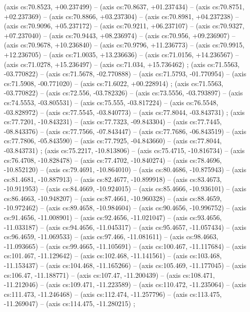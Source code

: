     (axis cs:70.8523,    +00.237499) --  (axis cs:70.8637,    +01.237434) --  (axis cs:70.8751,    +02.237369) --  (axis cs:70.8866,    +03.237304) --  (axis cs:70.8981,    +04.237238) --  (axis cs:70.9096,    +05.237172) --  (axis cs:70.9211,    +06.237107) --  (axis cs:70.9327,    +07.237040) --  (axis cs:70.9443,    +08.236974) --  (axis cs:70.956,    +09.236907) --  (axis cs:70.9678,    +10.236840) --  (axis cs:70.9796,    +11.236773) --  (axis cs:70.9915,    +12.236705) --  (axis cs:71.0035,    +13.236636) --  (axis cs:71.0156,    +14.236567) --  (axis cs:71.0278,    +15.236497) --  (axis cs:71.034,    +15.736462) ;
    (axis cs:71.5563,    -03.770822) --  (axis cs:71.5678,    -02.770888) --  (axis cs:71.5793,    -01.770954) --  (axis cs:71.5908,    -00.771020) --  (axis cs:71.6022,    +00.228914) ;
    (axis cs:71.5563,    -03.770822) --  (axis cs:72.556,    -03.782326) --  (axis cs:73.5556,    -03.793897) --  (axis cs:74.5553,    -03.805531) --  (axis cs:75.555,    -03.817224) --  (axis cs:76.5548,    -03.828972) --  (axis cs:77.5545,    -03.840773) --  (axis cs:77.8044,    -03.843731) ;
    (axis cs:77.7201,    -10.843231) --  (axis cs:77.7323,    -09.843304) --  (axis cs:77.7445,    -08.843376) --  (axis cs:77.7566,    -07.843447) --  (axis cs:77.7686,    -06.843519) --  (axis cs:77.7806,    -05.843590) --  (axis cs:77.7925,    -04.843660) --  (axis cs:77.8044,    -03.843731) ;
    (axis cs:75.2217,    -10.813806) --  (axis cs:75.4715,    -10.816734) --  (axis cs:76.4708,    -10.828478) --  (axis cs:77.4702,    -10.840274) --  (axis cs:78.4696,    -10.852120) --  (axis cs:79.4691,    -10.864010) --  (axis cs:80.4686,    -10.875943) --  (axis cs:81.4681,    -10.887913) --  (axis cs:82.4677,    -10.899918) --  (axis cs:83.4673,    -10.911953) --  (axis cs:84.4669,    -10.924015) --  (axis cs:85.4666,    -10.936101) --  (axis cs:86.4663,    -10.948207) --  (axis cs:87.4661,    -10.960328) --  (axis cs:88.4659,    -10.972462) --  (axis cs:89.4658,    -10.984604) --  (axis cs:90.4656,    -10.996752) --  (axis cs:91.4656,    -11.008901) --  (axis cs:92.4656,    -11.021047) --  (axis cs:93.4656,    -11.033187) --  (axis cs:94.4656,    -11.045317) --  (axis cs:95.4657,    -11.057434) --  (axis cs:96.4659,    -11.069533) --  (axis cs:97.466,    -11.081611) --  (axis cs:98.4663,    -11.093665) --  (axis cs:99.4665,    -11.105691) --  (axis cs:100.467,    -11.117684) --  (axis cs:101.467,    -11.129642) --  (axis cs:102.468,    -11.141561) --  (axis cs:103.468,    -11.153437) --  (axis cs:104.468,    -11.165266) --  (axis cs:105.469,    -11.177045) --  (axis cs:106.47,    -11.188771) --  (axis cs:107.47,    -11.200439) --  (axis cs:108.471,    -11.212046) --  (axis cs:109.471,    -11.223589) --  (axis cs:110.472,    -11.235064) --  (axis cs:111.473,    -11.246468) --  (axis cs:112.474,    -11.257796) --  (axis cs:113.475,    -11.269047) --  (axis cs:114.475,    -11.280215) ;
